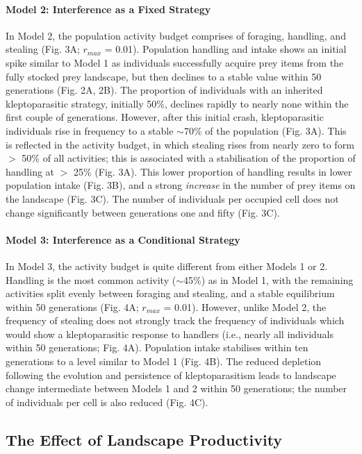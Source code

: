\documentclass[11pt]{article}
\begin{document}
\paragraph{Model 2: Interference as a Fixed Strategy}

In Model 2, the population activity budget comprises of foraging, handling, and stealing (Fig. 3A; $r_{max}$ = 0.01).
Population handling and intake shows an initial spike similar to Model 1 as individuals successfully acquire prey items from the fully stocked prey landscape, but then declines to a stable value within 50 generations (Fig. 2A, 2B).
The proportion of individuals with an inherited kleptoparasitic strategy, initially 50\%, declines rapidly to nearly none within the first couple of generations. 
However, after this initial crash, kleptoparasitic individuals rise in frequency to a stable $\sim$70\% of the population (Fig. 3A).
This is reflected in the activity budget, in which stealing rises from nearly zero to form $>$ 50\% of all activities; this is associated with a stabilisation of the proportion of handling at $>$ 25\% (Fig. 3A).
This lower proportion of handling results in lower population intake (Fig. 3B), and a strong \textit{increase} in the number of prey items on the landscape (Fig. 3C).
The number of individuals per occupied cell does not change significantly between generations one and fifty (Fig. 3C).

\paragraph{Model 3: Interference as a Conditional Strategy}

In Model 3, the activity budget is quite different from either Models 1 or 2.
Handling is the most common activity ($\sim$45\%) as in Model 1, with the remaining activities split evenly between foraging and stealing, and a stable equilibrium within 50 generations (Fig. 4A; $r_{max}$ = 0.01).
However, unlike Model 2, the frequency of stealing does not strongly track the frequency of individuals which would show a kleptoparasitic response to handlers (i.e., nearly all individuals within 50 generations; Fig. 4A).
Population intake stabilises within ten generations to a level similar to Model 1 (Fig. 4B).
The reduced depletion following the evolution and persistence of kleptoparasitism leads to landscape change intermediate between Models 1 and 2 within 50 generations; the number of individuals per cell is also reduced (Fig. 4C).

\subsection{The Effect of Landscape Productivity}
\end{document}
